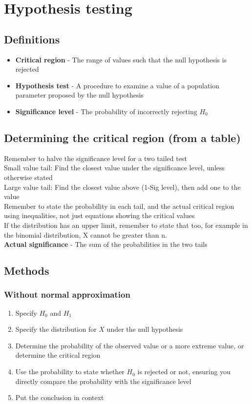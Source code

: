 \documentclass{article}[18pt]
\begin{document}
\section{Hypothesis testing}
\setitemize{}
\subsection{Definitions}
\begin{itemize}
\item \textbf{Critical region} - The range of values such that the null hypothesis is rejected
\item \textbf{Hypothesis test} - A procedure to examine a value of a population parameter proposed by the null hypothesis
\item \textbf{Significance level} - The probability of incorrectly rejecting $H_0$
\end{itemize}
\subsection{Determining the critical region (from a table)}
Remember to halve the significance level for a two tailed test\\
Small value tail: Find the closest value under the significance level, unless otherwise stated\\
Large value tail: Find the closest value above (1-Sig level), then add one to the value\\
Remember to state the probability in each tail, and the actual critical region using inequalities, not just equations showing the critical values\\
If the distribution has an upper limit, remember to state that too, for example in the binomial distribution, X cannot be greater than n.\\
\textbf{Actual significance} - The sum of the probabilities in the two tails
\newpage
\subsection{Methods}
\subsubsection{Without normal approximation}
\begin{enumerate}
\item Specify $H_0$ and $H_1$
\item Specify the distribution for $X$ under the null hypothesis
\item Determine the probability of the observed value or a more extreme value, or determine the critical region
\item Use the probability to state whether $H_0$ is rejected or not, ensuring you directly compare the probability with the significance level
\item Put the conclusion in context
\end{enumerate}
\end{document}
